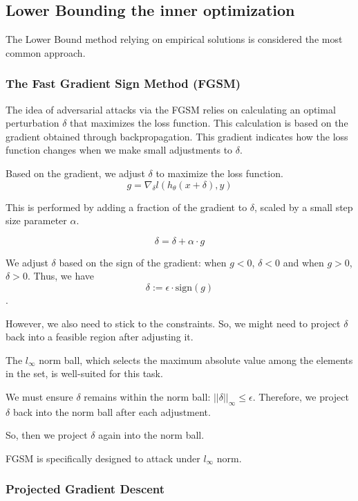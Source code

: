 \subsection{Lower Bounding the inner optimization}

The Lower Bound method relying on empirical solutions is considered the most common approach.

\subsubsection{The Fast Gradient Sign Method (FGSM)}

The idea of adversarial attacks via the FGSM relies on calculating an optimal perturbation 
$\delta$ that maximizes the loss function. This calculation is based on the gradient obtained through backpropagation. 
This gradient indicates how the loss function changes when we make small adjustments to $\delta$.

Based on the gradient, we adjust $\delta$ to maximize the loss function. 
\[g = \nabla_\delta l(h_\theta(x + \delta), y)\]

This is performed by adding a fraction of 
the gradient to $\delta$, scaled by a small step size parameter $\alpha$.

\[\delta = \delta +  \alpha \cdot g\]

We adjust $\delta$ based on the sign of the gradient: when $g<0$, $\delta < 0$ and when $g>0$, $\delta > 0$. 
Thus, we have \[\delta := \epsilon \cdot \text{sign}(g)\].

However, we also need to stick to the constraints. So, we might need to project $\delta$ back into a feasible region after adjusting it.

The  $l_{\infty}$ norm ball, which selects the maximum absolute value among the elements in the set, is well-suited for this task.

We must ensure $\delta$ remains within the norm ball: $||\delta||_\infty \leq \epsilon$. 
Therefore, we project $\delta$ back into the norm ball after each adjustment.


So, then we project $\delta$ again into the norm ball.  


FGSM is specifically designed to attack under $l_\infty$ norm. 


\subsubsection{Projected Gradient Descent}


